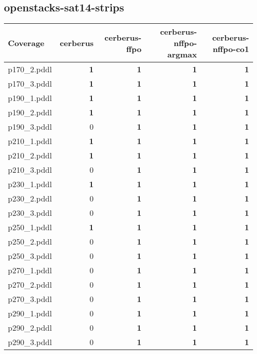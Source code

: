 \documentclass{article}
\begin{document}
\hypertarget{coverage-openstacks-sat14-strips}{}
\subsection*{openstacks-sat14-strips}

\begin{tabular}{@{}lrrrr@{}}
Coverage & cerberus & cerberus-ffpo & cerberus-nffpo-argmax & cerberus-nffpo-co1 \\
\midrule
p170_2.pddl & \textbf{1} & \textbf{1} & \textbf{1} & \textbf{1} \\
p170_3.pddl & \textbf{1} & \textbf{1} & \textbf{1} & \textbf{1} \\
p190_1.pddl & \textbf{1} & \textbf{1} & \textbf{1} & \textbf{1} \\
p190_2.pddl & \textbf{1} & \textbf{1} & \textbf{1} & \textbf{1} \\
p190_3.pddl & 0 & \textbf{1} & \textbf{1} & \textbf{1} \\
p210_1.pddl & \textbf{1} & \textbf{1} & \textbf{1} & \textbf{1} \\
p210_2.pddl & \textbf{1} & \textbf{1} & \textbf{1} & \textbf{1} \\
p210_3.pddl & 0 & \textbf{1} & \textbf{1} & \textbf{1} \\
p230_1.pddl & \textbf{1} & \textbf{1} & \textbf{1} & \textbf{1} \\
p230_2.pddl & 0 & \textbf{1} & \textbf{1} & \textbf{1} \\
p230_3.pddl & 0 & \textbf{1} & \textbf{1} & \textbf{1} \\
p250_1.pddl & \textbf{1} & \textbf{1} & \textbf{1} & \textbf{1} \\
p250_2.pddl & 0 & \textbf{1} & \textbf{1} & \textbf{1} \\
p250_3.pddl & 0 & \textbf{1} & \textbf{1} & \textbf{1} \\
p270_1.pddl & 0 & \textbf{1} & \textbf{1} & \textbf{1} \\
p270_2.pddl & 0 & \textbf{1} & \textbf{1} & \textbf{1} \\
p270_3.pddl & 0 & \textbf{1} & \textbf{1} & \textbf{1} \\
p290_1.pddl & 0 & \textbf{1} & \textbf{1} & \textbf{1} \\
p290_2.pddl & 0 & \textbf{1} & \textbf{1} & \textbf{1} \\
p290_3.pddl & 0 & \textbf{1} & \textbf{1} & \textbf{1} \\
\end{tabular}
\end{document}
